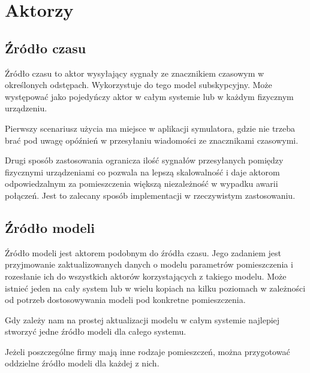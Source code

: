 \chapter{Aktorzy}\label{ch:aktorzy}

\section{Źródło czasu}
Źródło czasu to aktor wysyłający sygnały ze znacznikiem czasowym w określonych odstępach. Wykorzystuje do tego model subskypcyjny. Może występować jako pojedyńczy aktor w całym systemie lub w każdym fizycznym urządzeniu. 



Pierwszy scenariusz użycia ma miejsce w aplikacji symulatora, gdzie nie trzeba brać pod uwagę opóźnień w przesyłaniu wiadomości ze znacznikami czasowymi. 



Drugi sposób zastosowania ogranicza ilość sygnałów przesyłanych pomiędzy fizycznymi urządzeniami co pozwala na lepszą skalowalność i daje aktorom odpowiedzalnym za pomieszczenia większą niezależność w wypadku awarii połączeń. 
Jest to zalecany sposób implementacji w rzeczywistym zastosowaniu.

\section{Źródło modeli}
Źródło modeli jest aktorem podobnym do źródła czasu. 
Jego zadaniem jest przyjmowanie zaktualizowanych danych o modelu parametrów pomieszczenia i rozesłanie ich do wszystkich aktorów korzystających z takiego modelu.
Może istnieć jeden na cały system lub w wielu kopiach na kilku poziomach w zależności od potrzeb dostosowywania modeli pod konkretne pomieszczenia.



Gdy zależy nam na prostej aktualizacji modelu w całym systemie najlepiej stworzyć jedne źródło modeli dla całego systemu. 



Jeżeli poszczególne firmy mają inne rodzaje pomieszczeń, można przygotować oddzielne źródło modeli dla każdej z nich. 



